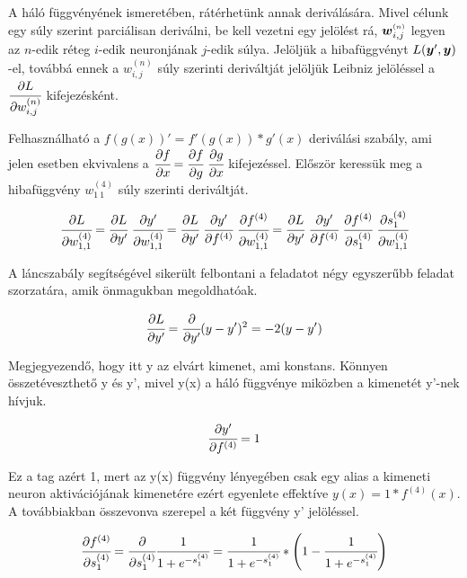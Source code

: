 A háló függvényének ismeretében, rátérhetünk annak deriválására. Mivel célunk egy súly szerint parciálisan deriválni, be kell vezetni egy jelölést rá, $\boldsymbol w^{{\scriptscriptstyle(n)}}_{i,j}$ legyen az $n$-edik réteg $i$-edik neuronjának $j$-edik súlya. Jelöljük a hibafüggvényt $L(\boldsymbol y',\boldsymbol y)$-el, továbbá ennek a $w^{(n)}_{i,j}$ súly szerinti deriváltját jelöljük Leibniz jelöléssel  a $\cfrac{\partial L}{\partial w^{(n)}_{i,j}}$ kifejezésként.  
 

Felhasználható a $f(g(x))' = f'(g(x))*g'(x)$ deriválási szabály, ami jelen esetben ekvivalens a $\cfrac{\partial f}{\partial x} =  \cfrac{\partial f}{\partial g}~ \cfrac{\partial g}{\partial x}$ kifejezéssel.
Először keressük meg a hibafüggvény $w^{(4)}_{1~1}$  súly szerinti deriváltját.

\begin{equation}
    \cfrac{\partial L}{\partial w^{(4)}_{1,1}} = \cfrac{\partial L}{\partial y'}~ \cfrac{\partial y'}{\partial w^{(4)}_{1,1}} = \cfrac{\partial L}{\partial y'}~ \cfrac{\partial y'}{\partial f^{(4)}}~\cfrac{\partial f^{(4)}}{\partial w^{(4)}_{1,1}} = \cfrac{\partial L}{\partial y'}~\cfrac{\partial y'}{\partial f^{(4)}}~\cfrac{\partial f^{(4)}}{\partial s^{(4)}_{1}}~\cfrac{\partial s^{(4)}_{1}}{\partial w^{(4)}_{1,1}}
    \label{derivoutputlayer}
\end{equation}

A láncszabály segítségével sikerült felbontani a feladatot négy egyszerűbb feladat szorzatára, amik önmagukban megoldhatóak.

\begin{equation}
    \cfrac{\partial L}{\partial y'} = \cfrac{\partial}{\partial y'}(y-y')^2= -2(y-y') 
\end{equation}

Megjegyezendő, hogy itt y az elvárt kimenet, ami konstans. Könnyen összetéveszthető y és y', mivel y(x) a háló függvénye miközben a kimenetét y'-nek hívjuk. 

\begin{equation}
    \cfrac{\partial y'}{\partial f^{(4)}} = 1
\end{equation}

Ez a tag azért 1, mert az y(x) függvény lényegében csak egy alias a kimeneti neuron aktivációjának kimenetére ezért egyenlete effektíve $y(x) = 1*f^{(4)}(x)$. A továbbiakban összevonva szerepel a két függvény y' jelöléssel.

\begin{equation}
    \cfrac{\partial f^{(4)}}{\partial s^{(4)}_{1}} = \cfrac {\partial}{\partial  s^{(4)}_{1}} \cfrac{1}{1+e^{- s^{(4)}_{1}}} = \cfrac{1}{1+e^{-s^{(4)}_{1}}}* \left(1 - \cfrac{1}{1+e^{-s^{(4)}_{1}}}\right)
\end{equation}

